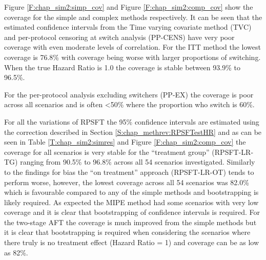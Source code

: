 Figure \ref{F:chap_sim2:simp_cov} and Figure \ref{F:chap_sim2:comp_cov} show the coverage for the simple and complex methods respectively. It can be seen that the estimated confidence intervals from the Time varying covariate method (TVC) and per-protocol censoring at switch analysis (PP-CENS) have very poor coverage with even moderate levels of correlation. For the ITT method the lowest coverage is 76.8\% with coverage being worse with larger proportions of switching. When the true Hazard Ratio is 1.0 the coverage is stable between 93.9\% to 96.5\%.

For the per-protocol analysis excluding switchers (PP-EX) the coverage is poor across all scenarios and is often <50\% where the proportion who switch is 60\%.

For all the variations of RPSFT the 95\% confidence intervals are estimated using the correction described in Section \ref{S:chap_methrev:RPSFTestHR} and as can be seen in Table \ref{T:chap_sim2:simres} and Figure \ref{F:chap_sim2:comp_cov} the coverage for all scenarios is very stable for the ``treatment group'' (RPSFT-LR-TG) ranging from 90.5\% to 96.8\% across all 54 scenarios investigated. Similarly to the findings for bias the ``on treatment'' approach (RPSFT-LR-OT) tends to perform worse, however, the lowest coverage across all 54 scenarios was 82.0\% which is favourable compared to any of the simple methods and bootstrapping is likely required. As expected the MIPE method had some scenarios with very low coverage and it is clear that bootstrapping of confidence intervals is required. For the two-stage AFT the coverage is much improved from the simple methods but it is clear that bootstrapping is required when considering the scenarios where there truly is no treatment effect (Hazard Ratio = 1) and coverage can be as low as 82\%.


